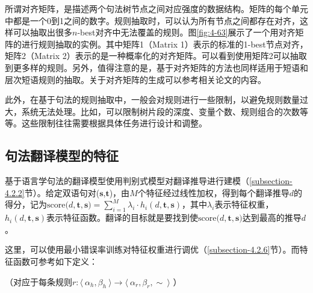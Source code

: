 \parinterval 所谓对齐矩阵，是描述两个句法树节点之间对应强度的数据结构。矩阵的每个单元中都是一个0到1之间的数字。规则抽取时，可以认为所有节点之间都存在对齐，这样可以抽取出很多$n$-best对齐中无法覆盖的规则。图\ref{fig:4-63}展示了一个用对齐矩阵的进行规则抽取的实例。其中矩阵1（Matrix 1）表示的标准的1-best节点对齐，矩阵2（Matrix 2）表示的是一种概率化的对齐矩阵。可以看到使用矩阵2可以抽取到更多样的规则。另外，值得注意的是，基于对齐矩阵的方法也同样适用于短语和层次短语规则的抽取。关于对齐矩阵的生成可以参考相关论文的内容\cite{xiao2013unsupervised,liu2009weighted,sun2010exploring,sun2010discriminative}。

\parinterval 此外，在基于句法的规则抽取中，一般会对规则进行一些限制，以避免规则数量过大，系统无法处理。比如，可以限制树片段的深度、变量个数、规则组合的次数等等。这些限制往往需要根据具体任务进行设计和调整。


\subsection{句法翻译模型的特征}

\parinterval 基于语言学句法的翻译模型使用判别式模型对翻译推导进行建模（\ref{subsection-4.2.2}节）。给定双语句对($\mathbf{s}$,$\mathbf{t}$)，由$M$个特征经过线性加权，得到每个翻译推导$d$的得分，记为$\textrm{score(}d,\mathbf{t},\mathbf{s})=\sum_{i=1}^{M} \lambda_i \cdot h_{i}(d,\mathbf{t},\mathbf{s})$，其中$\lambda_i$表示特征权重，$h_{i}(d,\mathbf{t},\mathbf{s})$表示特征函数。翻译的目标就是要找到使$\textrm{score(}d,\mathbf{t},\mathbf{s})$达到最高的推导$d$。

\parinterval 这里，可以使用最小错误率训练对特征权重进行调优（\ref{subsection-4.2.6}节）。而特征函数可参考如下定义：

\vspace{0.5em}
（对应于每条规则$r : \langle\  \alpha_h, \beta_h\ \rangle \to \langle\ \alpha_r, \beta_r, \sim\ \rangle$ ）


